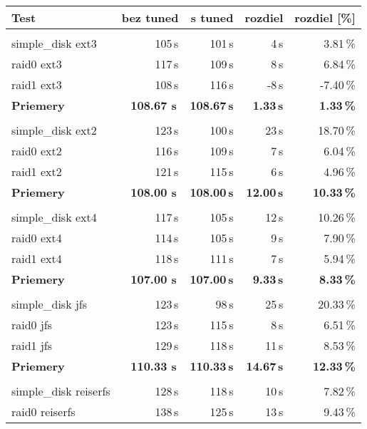 \begin{table}[H]
\begin{center}
\begin{tabular}{|l|r r r r|}
    \hline
    \textbf{Test} & \textbf{bez tuned} & \textbf{s tuned} & \textbf{rozdiel} & \textbf{rozdiel [\%]} \\
    \hline & \\[-1em]\hline
    simple\_disk ext3 & 105\,s & 101\,s & 4\,s & 3.81\,\% \\
    raid0 ext3 & 117\,s & 109\,s & 8\,s & 6.84\,\% \\
    raid1 ext3 & 108\,s & 116\,s & -8\,s & -7.40\,\% \\
    \hline
    \textbf{Priemery} & \textbf{108.67 s}\,& \textbf{108.67\,s} & \textbf{1.33\,s} & \textbf{1.33\,\%} \\
    \hline & \\[-1em]\hline
    simple\_disk ext2 & 123\,s & 100\,s & 23\,s & 18.70\,\% \\
    raid0 ext2 & 116\,s & 109\,s & 7\,s & 6.04\,\% \\
    raid1 ext2 & 121\,s & 115\,s & 6\,s & 4.96\,\% \\
    \hline
    \textbf{Priemery} & \textbf{108.00 s}\,& \textbf{108.00\,s} & \textbf{12.00\,s} & \textbf{10.33\,\%} \\
    \hline & \\[-1em]\hline
    simple\_disk ext4 & 117\,s & 105\,s & 12\,s & 10.26\,\% \\
    raid0 ext4 & 114\,s & 105\,s & 9\,s & 7.90\,\% \\
    raid1 ext4 & 118\,s & 111\,s & 7\,s & 5.94\,\% \\
    \hline
    \textbf{Priemery} & \textbf{107.00 s}\,& \textbf{107.00\,s} & \textbf{9.33\,s} & \textbf{8.33\,\%} \\
    \hline & \\[-1em]\hline
    simple\_disk jfs & 123\,s & 98\,s & 25\,s & 20.33\,\% \\
    raid0 jfs & 123\,s & 115\,s & 8\,s & 6.51\,\% \\
    raid1 jfs & 129\,s & 118\,s & 11\,s & 8.53\,\% \\
    \hline
    \textbf{Priemery} & \textbf{110.33 s}\,& \textbf{110.33\,s} & \textbf{14.67\,s} & \textbf{12.33\,\%} \\
    \hline & \\[-1em]\hline
    simple\_disk reiserfs & 128\,s & 118\,s & 10\,s & 7.82\,\% \\
    raid0 reiserfs & 138\,s & 125\,s & 13\,s & 9.43\,\% \\

\end{tabular}
\end{center}
\end{table}
